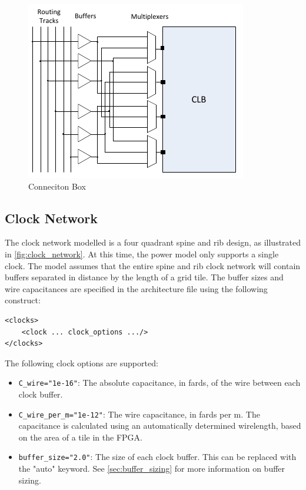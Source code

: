 \documentclass[letterpaper,twoside,10pt]{article}
\begin{document}
\begin{figure}[ht]
	\centering
		\includegraphics[scale=1.6]{images/cb.pdf}
	\caption{Conneciton Box}
	\label{fig:cb}
\end{figure}


\subsection{Clock Network}
The clock network modelled is a four quadrant spine and rib design, as illustrated in \autoref{fig:clock_network}. At this time, the power model only supports a single clock.
The model assumes that the entire spine and rib clock network will contain buffers separated in distance by the length of a grid tile.  
The buffer sizes and wire capacitances are specified in the architecture file using the following construct:

\begin{BVerbatim}[bgcolor=LightGray, boxwidth=\textwidth] 
<clocks>
	<clock ... clock_options .../>
</clocks>
\end{BVerbatim}


The following clock options are supported:
\vspace{-10pt}
\begin{itemize}
\item \texttt{C\_wire="1e-16"}: The absolute capacitance, in fards, of the wire between each clock buffer.
\item \texttt{C\_wire\_per\_m="1e-12"}: The wire capacitance, in fards per m.  The capacitance is calculated using an automatically determined wirelength, based on the area of a tile in the FPGA.
\item \texttt{buffer\_size="2.0"}: The size of each clock buffer.  This can be replaced with the "auto" keyword.  See \autoref{sec:buffer_sizing} for more information on buffer sizing.
\end{itemize}
\end{document}
